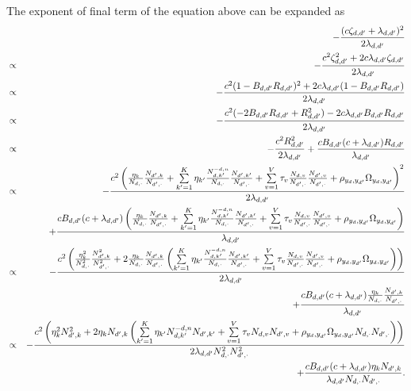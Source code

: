 The exponent of final term of the equation above can be expanded as
\begin{eqnarray}
&&-\frac {(c\zeta_{d,d'}+\lambda_{d,d'})^2} {2\lambda_{d,d'}}\\
&\propto& -\frac {c^2 \zeta_{d,d'}^2 + 2c\lambda_{d,d'} \zeta_{d,d'}} {2\lambda_{d,d'}}\\
&\propto& -\frac {c^2 (1 - B_{d,d'} R_{d,d'})^2 + 2c\lambda_{d,d'} (1 - B_{d,d'} R_{d,d'})} {2\lambda_{d,d'}}\\
&\propto& -\frac {c^2 (-2B_{d,d'} R_{d,d'} + R_{d,d'}^2) - 2c\lambda_{d,d'} B_{d,d'} R_{d,d'}} {2\lambda_{d,d'}}\\
&\propto& -\frac {c^2 R_{d,d'}^2} {2\lambda_{d,d'}} + \frac {cB_{d,d'} (c+\lambda_{d,d'}) R_{d,d'}} {\lambda_{d,d'}}\\
&\propto& -\frac {c^2 \left( \frac {\eta_k} {N_{d,\cdot}} \frac {N_{d',k}} {N_{d',\cdot}} + \sum\limits_{k'=1}^{K} \eta_{k'} \frac {N_{d,k'}^{-d,n}} {N_{d,\cdot}} \frac {N_{d',k'}} {N_{d',\cdot}} + \sum\limits_{v=1}^{V} \tau_v \frac {N_{d,v}} {N_{d',\cdot}} \frac {N_{d',v}} {N_{d',\cdot}} + \rho_{y_d, y_{d'}} \Omega_{y_d, y_{d'}} \right)^2} {2\lambda_{d,d'}} \notag\\
&& +\frac {cB_{d,d'} (c+\lambda_{d,d'}) \left( \frac {\eta_k} {N_{d,\cdot}} \frac {N_{d',k}} {N_{d',\cdot}} + \sum\limits_{k'=1}^{K} \eta_{k'} \frac {N_{d,k'}^{-d,n}} {N_{d,\cdot}} \frac {N_{d',k'}} {N_{d',\cdot}} + \sum\limits_{v=1}^{V} \tau_v \frac {N_{d,v}} {N_{d',\cdot}} \frac {N_{d',v}} {N_{d',\cdot}} + \rho_{y_d, y_{d'}} \Omega_{y_d, y_{d'}} \right)} {\lambda_{d,d'}}\\
&\propto& -\frac {c^2 \left( \frac {\eta_k^2} {N_{d,\cdot}^2} \frac {N_{d',k}^2} {N_{d',\cdot}^2} + 2 \frac {\eta_k} {N_{d,\cdot}} \frac {N_{d',k}} {N_{d',\cdot}} \left( \sum\limits_{k'=1}^{K} \eta_{k'} \frac {N_{d,k'}^{-d,n}} {N_{d,\cdot}} \frac {N_{d',k'}} {N_{d',\cdot}} + \sum\limits_{v=1}^{V} \tau_v \frac {N_{d,v}} {N_{d',\cdot}} \frac {N_{d',v}} {N_{d',\cdot}} + \rho_{y_d, y_{d'}} \Omega_{y_d, y_{d'}} \right) \right)} {2\lambda_{d,d'}} \notag\\
&& +\frac {cB_{d,d'} (c+\lambda_{d,d'}) \frac {\eta_k} {N_{d,\cdot}} \frac {N_{d',k}} {N_{d',\cdot}}} {\lambda_{d,d'}}\\
&\propto& -\frac {c^2 \left( \eta_k^2 N_{d',k}^2 + 2\eta_k N_{d',k} \left( \sum\limits_{k'=1}^{K} \eta_{k'} N_{d,k'}^{-d,n} N_{d',k'} + \sum\limits_{v=1}^{V} \tau_v N_{d,v} N_{d',v} + \rho_{y_d, y_{d'}} \Omega_{y_d, y_{d'}} N_{d,\cdot} N_{d',\cdot} \right) \right)} {2\lambda_{d,d'} N_{d,\cdot}^2 N_{d',\cdot}^2} \notag\\
&& + \frac {cB_{d,d'} (c+\lambda_{d,d'}) \eta_k N_{d',k}} {\lambda_{d,d'} N_{d,\cdot} N_{d',\cdot}}. \label{eq:hinge_topic_exp}
\end{eqnarray} 